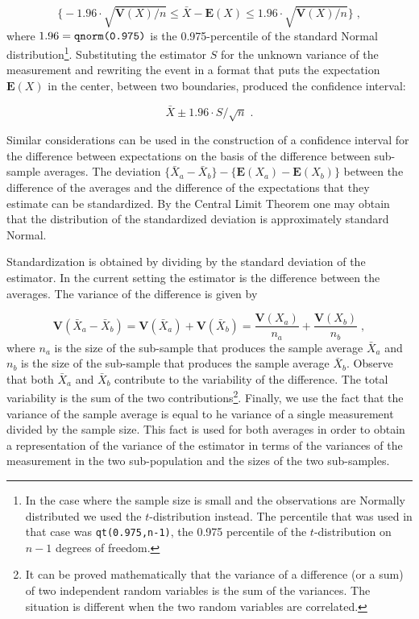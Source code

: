 \documentclass[]{krantz}
\newcommand{\Expec}{\mathbf{E}}
\newcommand{\Var}{\mathbf{V}}
\theoremstyle{definition}
\theoremstyle{definition}
\theoremstyle{definition}
\theoremstyle{remark}
\begin{document}
\[\big\{-1.96 \cdot \sqrt{\Var(X)/n} \leq \bar X - \Expec(X) \leq 1.96 \cdot \sqrt{\Var(X)/n}\big\}\;,\]
where \(1.96 = \mbox{\texttt{qnorm(0.975)}}\) is the 0.975-percentile of
the standard Normal distribution\footnote{In the case where the sample size is small and the observations
  are Normally distributed we used the \(t\)-distribution instead. The
  percentile that was used in that case was \texttt{qt(0.975,n-1)}, the 0.975
  percentile of the \(t\)-distribution on \(n-1\) degrees of freedom.}. Substituting the estimator \(S\) for
the unknown variance of the measurement and rewriting the event in a
format that puts the expectation \(\Expec(X)\) in the center, between two
boundaries, produced the confidence interval:

\[\bar X \pm 1.96 \cdot S/\sqrt{n}\;.\]

Similar considerations can be used in the construction of a confidence
interval for the difference between expectations on the basis of the
difference between sub-sample averages. The deviation
\(\{\bar X_a- \bar X_b\} - \{\Expec(X_a)- \Expec(X_b)\}\) between the
difference of the averages and the difference of the expectations that
they estimate can be standardized. By the Central Limit Theorem one may
obtain that the distribution of the standardized deviation is
approximately standard Normal.

Standardization is obtained by dividing by the standard deviation of the
estimator. In the current setting the estimator is the difference
between the averages. The variance of the difference is given by

\[\Var(\bar X_a- \bar X_b) = \Var(\bar X_a) + \Var(\bar X_b) = \frac{\Var(X_a)}{n_a} + \frac{\Var(X_b)}{n_b}\;,\]
where \(n_a\) is the size of the sub-sample that produces the sample
average \(\bar X_a\) and \(n_b\) is the size of the sub-sample that produces
the sample average \(\bar X_b\). Observe that both \(\bar X_a\) and
\(\bar X_b\) contribute to the variability of the difference. The total
variability is the sum of the two contributions\footnote{It can be proved mathematically that the variance of a difference
  (or a sum) of two independent random variables is the sum of the
  variances. The situation is different when the two random variables
  are correlated.}. Finally, we use the
fact that the variance of the sample average is equal to he variance of
a single measurement divided by the sample size. This fact is used for
both averages in order to obtain a representation of the variance of the
estimator in terms of the variances of the measurement in the two
sub-population and the sizes of the two sub-samples.
\end{document}
